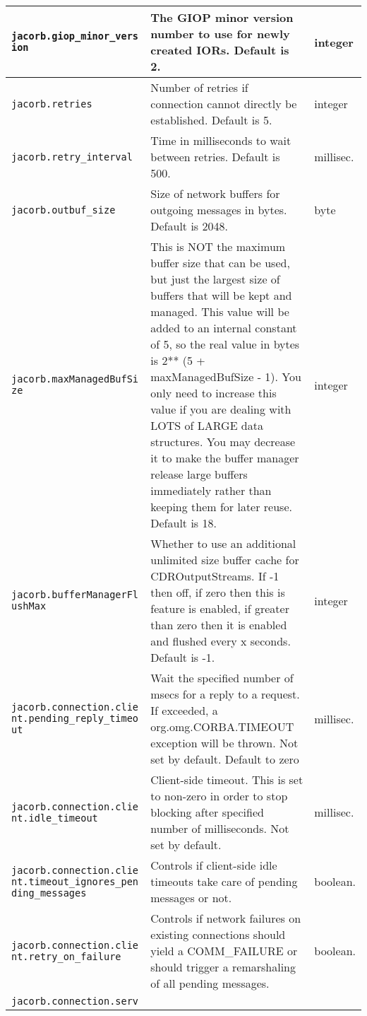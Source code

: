 \begin{small}
\begin{longtable}{|p{5cm}|p{9cm}|p{2cm}|}
\hline
\verb"jacorb.giop_minor_vers"
\verb"ion" & The GIOP minor version number to use for newly created IORs. Default is 2. & integer \\
\hline
\verb"jacorb.retries" & Number of retries if connection cannot directly be established. Default is 5. & integer \\
\hline
\verb"jacorb.retry_interval" & Time in milliseconds to wait between retries. Default is 500. & millisec. \\
\hline
\verb"jacorb.outbuf_size" & Size of network buffers for outgoing messages in bytes. Default is 2048. & byte \\
\hline
\verb"jacorb.maxManagedBufSi"
\verb"ze" & This is NOT the maximum buffer size that can be used, but just the largest size of buffers that will be kept and managed. This value will be added to an internal constant of 5, so the real value in bytes is 2** (5 + maxManagedBufSize - 1). You only need to increase this value if you are dealing with LOTS of LARGE data structures. You may decrease it to make the buffer manager release large buffers immediately rather than keeping them for later reuse. Default is 18. & integer \\
\hline
\verb"jacorb.bufferManagerFl"
\verb"ushMax" & Whether to use an additional unlimited size buffer cache for CDROutputStreams. If -1 then off, if zero then this is feature is enabled, if greater than zero then it is enabled and flushed every x seconds. Default is -1. & integer \\
\hline
\verb"jacorb.connection.clie"
\verb"nt.pending_reply_timeo"
\verb"ut" &  Wait the specified number of msecs for a reply to a request. If exceeded, a org.omg.CORBA.TIMEOUT exception will be thrown. Not set by default. Default to zero & millisec. \\
\hline
\verb"jacorb.connection.clie"
\verb"nt.idle_timeout" & Client-side timeout. This is set to non-zero in order
to stop blocking after specified number of milliseconds. Not set by default. &
millisec. \\
\hline
\verb"jacorb.connection.clie"
\verb"nt.timeout_ignores_pen"
\verb"ding_messages" & Controls if client-side idle timeouts take care of
pending messages or not. & boolean. \\
\hline
\verb"jacorb.connection.clie"
\verb"nt.retry_on_failure" & Controls if network failures on existing connections
should yield a COMM\_FAILURE or should trigger a remarshaling
of all pending messages. & boolean. \\
\hline
\verb"jacorb.connection.serv"

\end{longtable}
\end{small}
